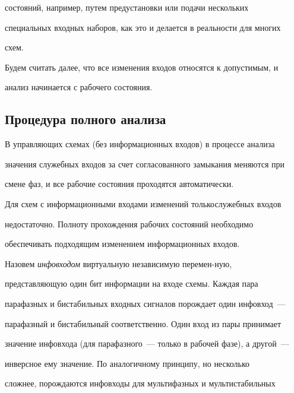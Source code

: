 состояний, например, путем предустановки или подачи нескольких 


специальных входных наборов, как это и делается в реальности для многих 


схем.





Будем считать далее, что все изменения входов относятся к допустимым, и 


анализ начинается с рабочего состояния.





\subsection{Процедура полного анализа} %





В управляющих схемах (без информационных входов) в процессе анализа 


значения служебных входов за счет согласованного замыкания меняются при 


смене фаз, и все рабочие состояния проходятся автоматически.





Для схем с информационными входами изменений только\linebreak служебных входов 


недостаточно. Полноту прохождения рабочих состояний необходимо 


обеспечивать подходящим изменением информационных входов.





Назовем \textit{инфовходом} виртуальную независимую перемен-\linebreak ную, 


представляющую один бит информации на входе схемы. Каждая пара 


парафазных и бистабильных входных сигналов порождает один инфовход~--- 


парафазный и бистабильный соответственно. Один вход из пары принимает 


значение инфовхода (для парафазного~--- только в рабочей фазе), а другой~--- 


инверсное ему значение. По аналогичному принципу, но несколько 


сложнее, порождаются инфовходы для мультифазных и мультистабильных 


